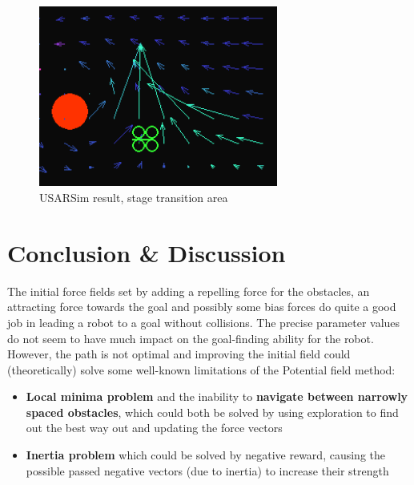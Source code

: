 \documentclass[11pt]{article}
\begin{document}
  \begin{figure}
    \begin{center}
    \includegraphics[width=0.7\textwidth]{img/usarsim_transition}
    \caption{USARSim result, stage transition area}
    \label{fig:usarsim_transition}
    \end{center}
  \end{figure}






\section{Conclusion \& Discussion}
\label{sec:conclusion}

The initial force fields set by adding a repelling force for the obstacles, an attracting force towards the goal and possibly some bias forces do quite a good job in leading a robot to a goal without collisions. The precise parameter values do not seem to have much impact on the goal-finding ability for the robot. However, the path is not optimal and improving the initial field could (theoretically) solve some well-known limitations\cite{koren91} of the Potential field method:

\begin{itemize}
 \item \textbf{Local minima problem} and the inability to \textbf{navigate between narrowly spaced obstacles}, which could both be solved by using exploration to find out the best way out and updating the force vectors
 \item \textbf{Inertia problem} which could be solved by negative reward, causing the possible passed negative vectors (due to inertia) to increase their strength
\end{itemize}
\end{document}
